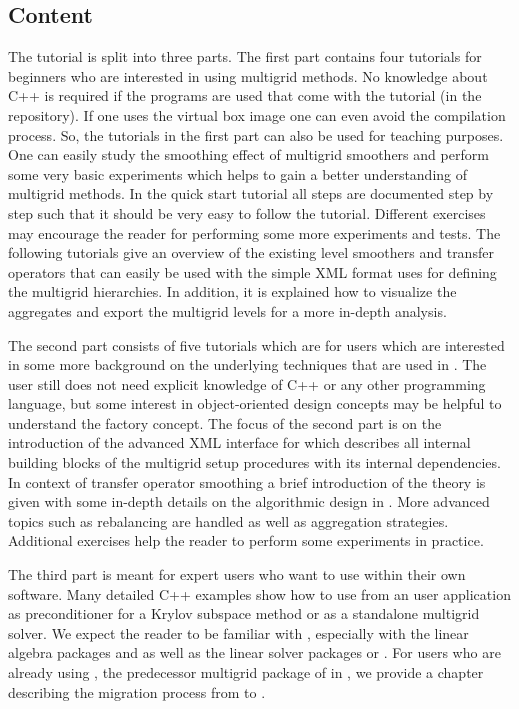 \documentclass[10pt,fleqn]{book}
\begin{document}
\subsection*{Content}
The tutorial is split into three parts. The first part contains four tutorials for beginners who are interested in using multigrid methods.
No knowledge about C++ is required if the programs are used that come with the tutorial (in the \trilinos repository). If one uses the virtual box image one can even avoid the \trilinos compilation process.
So, the tutorials in the first part can also be used for teaching purposes. One can easily study the smoothing effect of multigrid smoothers and perform some very basic experiments which helps to gain a better understanding of multigrid methods. In the quick start tutorial all steps are documented step by step such that it should be very easy to follow the tutorial. Different exercises may encourage the reader for performing some more experiments and tests. The following tutorials give an overview of the existing level smoothers and transfer operators that can easily be used with the simple XML format \muelu uses for defining the multigrid hierarchies. In addition, it is explained how to visualize the aggregates and export the multigrid levels for a more in-depth analysis.

The second part consists of five tutorials which are for users which are interested in some more background on the underlying techniques that are used in \muelu. The user still does not need explicit knowledge of C++ or any other programming language, but some interest in object-oriented design concepts may be helpful to understand the factory concept. The focus of the second part is on the introduction of the advanced XML interface for \muelu which describes all internal building blocks of the multigrid setup procedures with its internal dependencies. In context of transfer operator smoothing a brief introduction of the theory is given with some in-depth details on the algorithmic design in \muelu. More advanced topics such as rebalancing are handled as well as aggregation strategies. Additional exercises help the reader to perform some experiments in practice.

The third part is meant for expert users who want to use \muelu within their own software. Many detailed C++ examples show how to use \muelu from an user application as preconditioner for a Krylov subspace method or as a standalone multigrid solver. We expect the reader to be familiar with \trilinos, especially with the linear algebra packages \epetra and \tpetra as well as the linear solver packages \aztecoo or \belos. For users who are already using \ml, the predecessor multigrid package of \muelu in \trilinos, we provide a chapter describing the migration process from \ml to \muelu.
\end{document}
